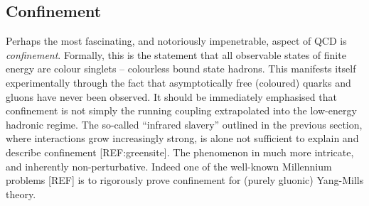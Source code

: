 \documentclass[12pt, a4paper, twoside]{book}
\begin{document}
\subsection{Confinement}
\label{sec:confinement}
Perhaps the most fascinating, and notoriously impenetrable, aspect of QCD is \emph{confinement}. Formally, this is the statement that all observable states of finite energy are colour singlets -- colourless bound state hadrons. This manifests itself experimentally through the fact that asymptotically free (coloured) quarks and gluons have never been observed. It should be immediately emphasised that confinement is not simply the running coupling extrapolated into the low-energy hadronic regime. The so-called ``infrared slavery'' outlined in the previous section, where interactions grow increasingly strong, is alone not sufficient to explain and describe confinement [REF:greensite]. The phenomenon in much more intricate, and inherently non-perturbative. Indeed one of the well-known Millennium problems [REF] is to rigorously prove confinement for (purely gluonic) Yang-Mills theory.
\end{document}
